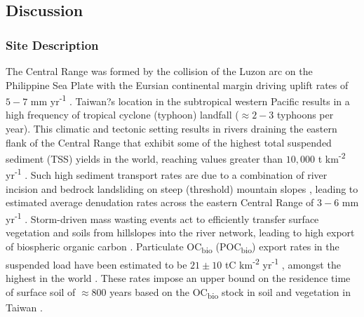 \subsection{Discussion}

\subsubsection{Site Description}\label{Ch6SD1}

The Central Range was formed by the collision of the Luzon arc on the Philippine Sea Plate with the Eursian continental margin driving uplift rates of $5 - 7$ mm yr\textsuperscript{-1} \citep{Teng:1990tu,Dadson:2003kl}. Taiwan?s location in the subtropical western Pacific results in a high frequency of tropical cyclone (typhoon) landfall ($\approx 2 - 3$ typhoons per year). This climatic and tectonic setting results in rivers draining the eastern flank of the Central Range that exhibit some of the highest total suspended sediment (TSS) yields in the world, reaching values greater than $10,000$ t km\textsuperscript{-2} yr\textsuperscript{-1} \citep{Dadson:2003kl}. Such high sediment transport rates are due to a combination of river incision and bedrock landsliding on steep (threshold) mountain slopes \citep{Hovius:2000ht}, leading to estimated average denudation rates across the eastern Central Range of $3 - 6$ mm yr\textsuperscript{-1} \citep{Dadson:2003kl}. Storm-driven mass wasting events act to efficiently transfer surface vegetation and soils from hillslopes into the river network, leading to high export of biospheric organic carbon \citep[OC\textsubscript{bio};][]{Hilton:2008fo}. Particulate OC\textsubscript{bio} (POC\textsubscript{bio}) export rates in the suspended load have been estimated to be $21 \pm 10$ tC km\textsuperscript{-2} yr\textsuperscript{-1} \citep{Hilton:2012dt}, amongst the highest in the world \citep{Galy:2015fx}. These rates impose an upper bound on the residence time of surface soil of $\approx 800$ years based on the OC\textsubscript{bio} stock in soil and vegetation in Taiwan \citep{Hilton:2012dt}.

